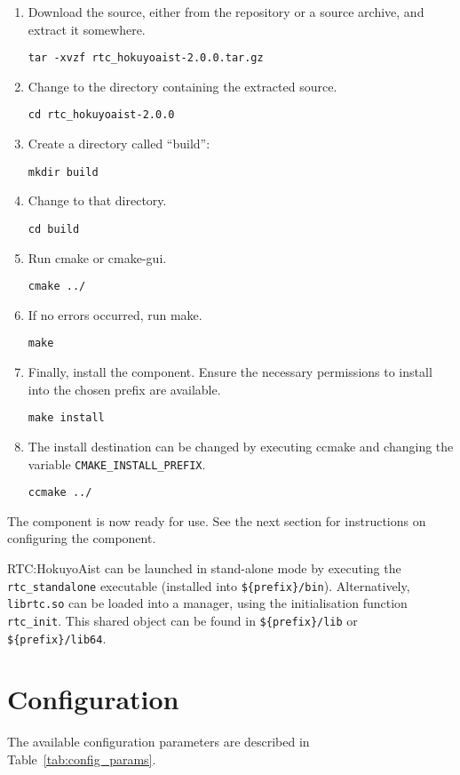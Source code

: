 \documentclass[a4paper,10pt]{article}
\begin{document}
\begin{enumerate}
  \item Download the source, either from the repository or a source archive,
  and extract it somewhere.

  \verb|tar -xvzf rtc_hokuyoaist-2.0.0.tar.gz|
  \item Change to the directory containing the extracted source.

  \verb|cd rtc_hokuyoaist-2.0.0|
  \item Create a directory called ``build'':

  \verb|mkdir build|
  \item Change to that directory.

  \verb|cd build|
  \item Run cmake or cmake-gui.

  \verb|cmake ../|
  \item If no errors occurred, run make.

  \verb|make|
  \item Finally, install the component. Ensure the necessary permissions to
  install into the chosen prefix are available.

  \verb|make install|
  \item The install destination can be changed by executing ccmake and changing
  the variable \verb|CMAKE_INSTALL_PREFIX|.

  \verb|ccmake ../|
\end{enumerate}

The component is now ready for use. See the next section for instructions on
configuring the component.

RTC:HokuyoAist can be launched in stand-alone mode by executing the
\verb|rtc_standalone| executable (installed into \verb|${prefix}/bin|).
Alternatively, \verb|librtc.so| can be loaded into a manager, using the
initialisation function \verb|rtc_init|. This shared object can be found in
\verb|${prefix}/lib| or \verb|${prefix}/lib64|.


\section{Configuration}
\label{sec:configuration}

The available configuration parameters are described in
Table~\ref{tab:config_params}.
\end{document}
